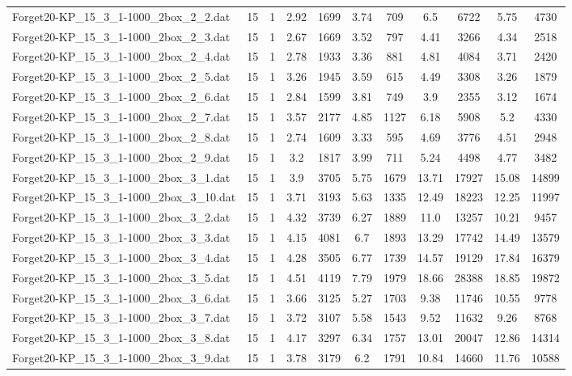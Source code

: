 \begin{table}[!ht]
\begin{tabular}{lcccccccccc}
Forget20-KP\_15\_3\_1-1000\_2box\_2\_2.dat & 15 & 1 & 2.92 & 1699 & 3.74 & 709 & 6.5 & 6722 & 5.75 & 4730 \\
Forget20-KP\_15\_3\_1-1000\_2box\_2\_3.dat & 15 & 1 & 2.67 & 1669 & 3.52 & 797 & 4.41 & 3266 & 4.34 & 2518 \\
Forget20-KP\_15\_3\_1-1000\_2box\_2\_4.dat & 15 & 1 & 2.78 & 1933 & 3.36 & 881 & 4.81 & 4084 & 3.71 & 2420 \\
Forget20-KP\_15\_3\_1-1000\_2box\_2\_5.dat & 15 & 1 & 3.26 & 1945 & 3.59 & 615 & 4.49 & 3308 & 3.26 & 1879 \\
Forget20-KP\_15\_3\_1-1000\_2box\_2\_6.dat & 15 & 1 & 2.84 & 1599 & 3.81 & 749 & 3.9 & 2355 & 3.12 & 1674 \\
Forget20-KP\_15\_3\_1-1000\_2box\_2\_7.dat & 15 & 1 & 3.57 & 2177 & 4.85 & 1127 & 6.18 & 5908 & 5.2 & 4330 \\
Forget20-KP\_15\_3\_1-1000\_2box\_2\_8.dat & 15 & 1 & 2.74 & 1609 & 3.33 & 595 & 4.69 & 3776 & 4.51 & 2948 \\
Forget20-KP\_15\_3\_1-1000\_2box\_2\_9.dat & 15 & 1 & 3.2 & 1817 & 3.99 & 711 & 5.24 & 4498 & 4.77 & 3482 \\
Forget20-KP\_15\_3\_1-1000\_2box\_3\_1.dat & 15 & 1 & 3.9 & 3705 & 5.75 & 1679 & 13.71 & 17927 & 15.08 & 14899 \\
Forget20-KP\_15\_3\_1-1000\_2box\_3\_10.dat & 15 & 1 & 3.71 & 3193 & 5.63 & 1335 & 12.49 & 18223 & 12.25 & 11997 \\
Forget20-KP\_15\_3\_1-1000\_2box\_3\_2.dat & 15 & 1 & 4.32 & 3739 & 6.27 & 1889 & 11.0 & 13257 & 10.21 & 9457 \\
Forget20-KP\_15\_3\_1-1000\_2box\_3\_3.dat & 15 & 1 & 4.15 & 4081 & 6.7 & 1893 & 13.29 & 17742 & 14.49 & 13579 \\
Forget20-KP\_15\_3\_1-1000\_2box\_3\_4.dat & 15 & 1 & 4.28 & 3505 & 6.77 & 1739 & 14.57 & 19129 & 17.84 & 16379 \\
Forget20-KP\_15\_3\_1-1000\_2box\_3\_5.dat & 15 & 1 & 4.51 & 4119 & 7.79 & 1979 & 18.66 & 28388 & 18.85 & 19872 \\
Forget20-KP\_15\_3\_1-1000\_2box\_3\_6.dat & 15 & 1 & 3.66 & 3125 & 5.27 & 1703 & 9.38 & 11746 & 10.55 & 9778 \\
Forget20-KP\_15\_3\_1-1000\_2box\_3\_7.dat & 15 & 1 & 3.72 & 3107 & 5.58 & 1543 & 9.52 & 11632 & 9.26 & 8768 \\
Forget20-KP\_15\_3\_1-1000\_2box\_3\_8.dat & 15 & 1 & 4.17 & 3297 & 6.34 & 1757 & 13.01 & 20047 & 12.86 & 14314 \\
Forget20-KP\_15\_3\_1-1000\_2box\_3\_9.dat & 15 & 1 & 3.78 & 3179 & 6.2 & 1791 & 10.84 & 14660 & 11.76 & 10588 \\

\end{tabular}
\end{table}
